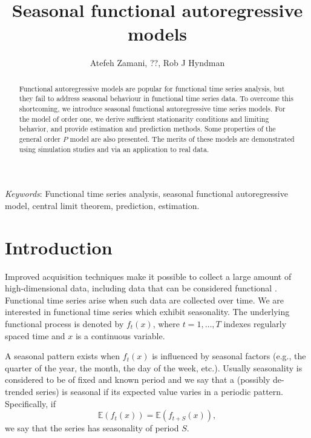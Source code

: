 \documentclass[11pt,a4paper]{article}
\numberwithin{equation}{section}
\newcommand{\E}{\mathbb{E}}
\begin{document}
\title{Seasonal functional autoregressive models}
\author{Atefeh Zamani, ??, Rob J Hyndman}
\maketitle

\begin{abstract}
  Functional autoregressive models are popular for functional time series analysis, but they fail to address seasonal behaviour in functional time series data. To overcome this shortcoming, we introduce seasonal functional autoregressive time series models. For the model of order one, we derive sufficient stationarity conditions and limiting behavior, and provide estimation and prediction methods. Some properties of the general order $P$ model are also presented. The merits of these models are demonstrated using simulation studies and via an application to real data.
\end{abstract}

\emph{Keywords}:
  Functional time series analysis, seasonal functional autoregressive model, central limit theorem, prediction, estimation.

\onehalfspacing


\section{Introduction}\label{sec:intro}

Improved acquisition techniques make it possible to collect a large amount of high-dimensional data, including data that can be considered functional \citep{ramsay1982data}. Functional time series arise when such data are collected over time. We are interested in functional time series which exhibit seasonality. The underlying functional process is denoted by $f_t(x)$, where $t=1,\dots,T$ indexes regularly spaced time and $x$ is a continuous variable.

A seasonal pattern exists when $f_t(x)$ is influenced by seasonal factors (e.g., the quarter of the year, the month, the day of the week, etc.). Usually seasonality is considered to be of fixed and known period and we say that a (possibly de-trended series) is seasonal if its expected value varies in a periodic pattern. Specifically, if
$$
  \E(f_{t}(x)) = \E(f_{t+S}(x)),
$$
we say that the series has seasonality of period $S$.
\end{document}
